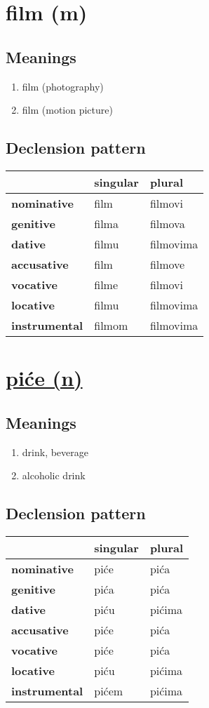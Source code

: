 \filbreak
\section{film (m)}
\subsection*{Meanings}
\begin{enumerate}
\item film (photography)
\item film (motion picture)
\end{enumerate}
\subsection*{Declension pattern}
\begin{tabularx}{\linewidth}{Xll}
\toprule
{} & singular &     plural \\
\midrule
\textbf{nominative  } &     film &    filmovi \\
\textbf{genitive    } &    filma &    filmova \\
\textbf{dative      } &    filmu &  filmovima \\
\textbf{accusative  } &     film &    filmove \\
\textbf{vocative    } &    filme &    filmovi \\
\textbf{locative    } &    filmu &  filmovima \\
\textbf{instrumental} &   filmom &  filmovima \\
\bottomrule
\end{tabularx}

\filbreak
\section{\underline{piće (n)}}
\subsection*{Meanings}
\begin{enumerate}
\item drink, beverage
\item alcoholic drink
\end{enumerate}
\subsection*{Declension pattern}
\begin{tabularx}{\linewidth}{Xll}
\toprule
{} & singular &  plural \\
\midrule
\textbf{nominative  } &     piće &    pića \\
\textbf{genitive    } &     pića &    pića \\
\textbf{dative      } &     piću &  pićima \\
\textbf{accusative  } &     piće &    pića \\
\textbf{vocative    } &     piće &    pića \\
\textbf{locative    } &     piću &  pićima \\
\textbf{instrumental} &    pićem &  pićima \\
\bottomrule
\end{tabularx}

